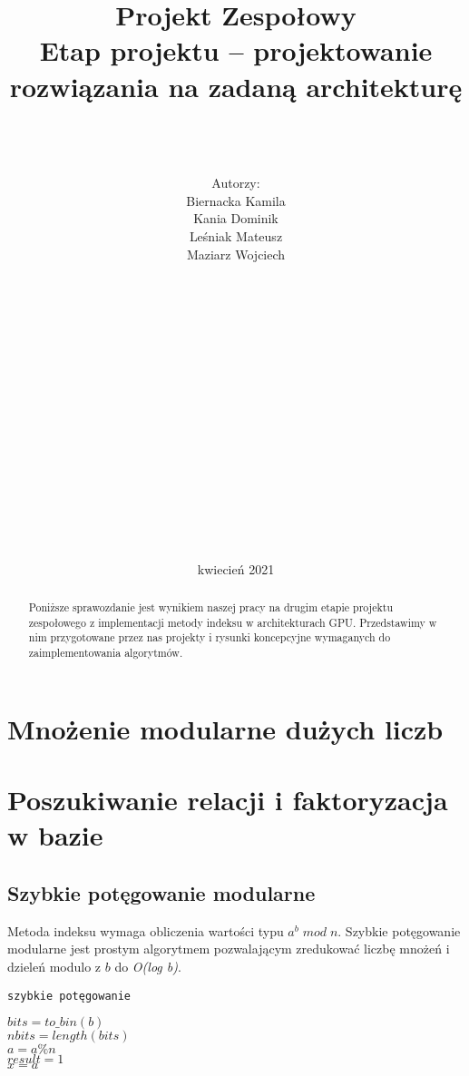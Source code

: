 \documentclass[]{article}
\title{Projekt Zespołowy \\
	\Huge Etap projektu – projektowanie rozwiązania na zadaną architekturę}
\author{\\ \\ \\ Autorzy:
	\\Biernacka Kamila\\ 
	Kania Dominik\\ 
	Leśniak Mateusz\\ 
	Maziarz Wojciech\\ \\ \\ \\ \\ \\ \\ \\ \\ \\ \\ \\ \\ \\ \\ \\ \\  }
\date{kwiecień 2021}
\begin{document}
\maketitle
\newpage



\begin{abstract}

Poniższe sprawozdanie jest wynikiem naszej pracy na drugim etapie projektu zespołowego z implementacji metody indeksu w architekturach GPU. Przedstawimy w nim przygotowane przez nas projekty i rysunki koncepcyjne wymaganych do zaimplementowania algorytmów.

\tableofcontents
\newpage

\end{abstract}

\section{Mnożenie modularne dużych liczb}
	
\section{Poszukiwanie relacji i faktoryzacja w bazie}
	\subsection{Szybkie potęgowanie modularne}
	Metoda indeksu wymaga obliczenia wartości typu $a^{b}\;{mod}\;n$.
	Szybkie potęgowanie modularne jest prostym algorytmem pozwalającym zredukować liczbę mnożeń i dzieleń modulo z $b$ do \textit{O(log b)}.
	
	\begin{algorithm}[H]
		\caption{\texttt{szybkie potęgowanie}} \label{szybkie_pot} 
		
		\BlankLine
		$bits=to\_bin(b)$\\
		$nbits=length(bits)$\\
		$a=a\%n$\\
		$result=1$\\
		$x=a$\\
		
	\end{algorithm}
	
\end{document}
